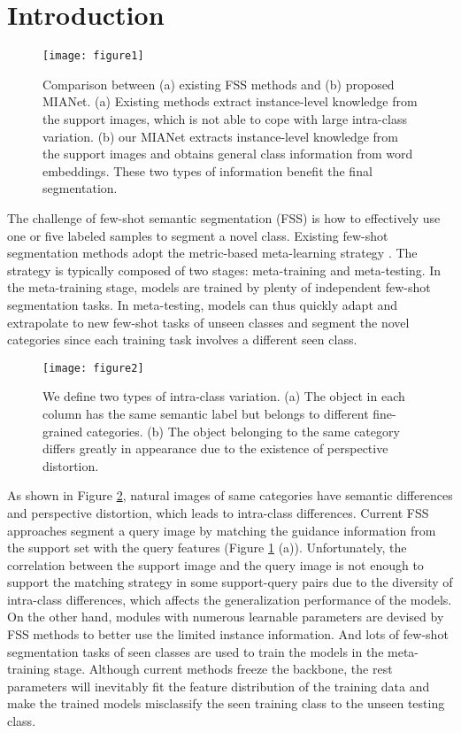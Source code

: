 \documentclass[10pt,twocolumn,letterpaper]{article}
\begin{document}
\section{Introduction}
\begin{figure}[htbp]
	\centering
	\texttt{[image: figure1]}
	\caption{Comparison between (a) existing FSS methods and (b) proposed MIANet. (a) Existing methods extract instance-level knowledge from the support images, which is not able to cope with large intra-class variation. (b) our MIANet extracts instance-level knowledge from the support images and obtains general class information from word embeddings. These two types of information benefit the final segmentation.}
	\label{figure1}
\end{figure}
The challenge of few-shot semantic segmentation (FSS) is how to effectively use one or five labeled samples to segment a novel class. Existing few-shot segmentation methods \cite{pfenet, panet, canet,cmn} adopt the metric-based meta-learning strategy \cite{meta-learning, oslsm}. The strategy is typically composed of two stages: meta-training and meta-testing. In the meta-training stage, models are trained by plenty of independent few-shot segmentation tasks. In meta-testing, models can thus quickly adapt and extrapolate to new few-shot tasks of unseen classes and segment the novel categories since each training task involves a different seen class.\par
\begin{figure}[htbp]
	\centering
	\texttt{[image: figure2]}
	\caption{We define two types of intra-class variation. (a) The object in each column has the same semantic label but belongs to different fine-grained categories. (b) The object belonging to the same category differs greatly in appearance due to the existence of perspective distortion.}
	\label{figure2}
\end{figure}

As shown in Figure \ref{figure2}, natural images of same categories have semantic differences and perspective distortion, which leads to intra-class differences. Current FSS approaches segment a query image by matching the guidance information from the support set with the query features (Figure \ref{figure1} (a)). Unfortunately, the correlation between the support image and the query image is not enough to support the matching strategy in some support-query pairs due to the diversity of intra-class differences, which affects the generalization performance of the models. On the other hand, modules with numerous learnable parameters are devised by FSS methods to better use the limited instance information. And lots of few-shot segmentation tasks of seen classes are used to train the models in the meta-training stage. Although current methods freeze the backbone, the rest parameters will inevitably fit the feature distribution of the training data and make the trained models misclassify the seen training class to the unseen testing class.
\end{document}
